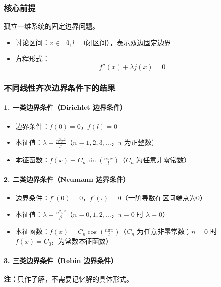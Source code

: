 \documentclass{article}
\begin{document}
	\subsubsection{核心前提}
	孤立一维系统的固定边界问题。
	\begin{itemize}
		\item 讨论区间：$ x \in [0, l] $（闭区间），表示双边固定边界
		\item 方程形式：
		 $$ f''(x) + \lambda f(x) = 0 $$
	\end{itemize}
	
	\subsubsection{不同线性齐次边界条件下的结果}
	
	\paragraph{1. 一类边界条件（Dirichlet 边界条件）}
	\begin{itemize}
		\item 边界条件：$ f(0) = 0 $，$ f(l) = 0 $
		\item 本征值：$ \lambda = \frac{n^2 \pi^2}{l^2} $（$ n = 1, 2, 3, \dots $，$ n $ 为正整数）
		\item 本征函数：$ f(x) = C_n \sin\left( \frac{n \pi x}{l} \right) $（$ C_n $ 为任意非零常数）
	\end{itemize}
	
	\paragraph{2. 二类边界条件（Neumann 边界条件）}
	\begin{itemize}
		\item 边界条件：$ f'(0) = 0 $，$ f'(l) = 0 $（一阶导数在区间端点为0）
		\item 本征值：$ \lambda = \frac{n^2 \pi^2}{l^2} $（$ n = 0, 1, 2, \dots $，$ n=0 $ 时 $ \lambda=0 $）
		\item 本征函数：$ f(x) = C_n \cos\left( \frac{n \pi x}{l} \right) $（$ C_n $ 为任意非零常数；$ n=0 $ 时 $ f(x)=C_0 $，为常数本征函数）
	\end{itemize}
	
	\paragraph{3. 三类边界条件（Robin 边界条件）}  \textbf{注：}只作了解，不需要记忆解的具体形式。
	
\end{document}
